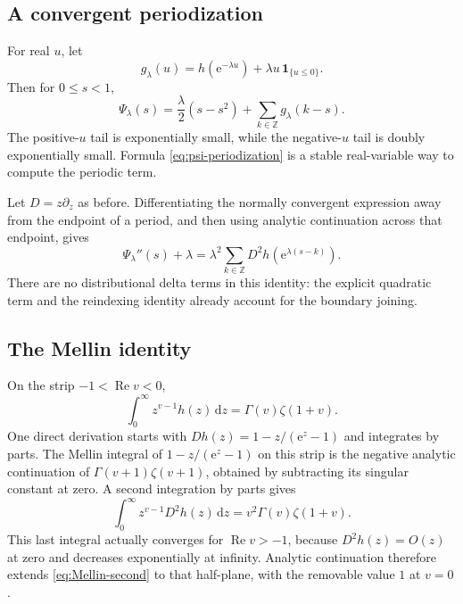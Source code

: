 \documentclass[11pt,a4paper]{article}
\numberwithin{equation}{section}
\theoremstyle{definition}
\newcommand{\Z}{\mathbb Z}
\newcommand{\dd}{\,\mathrm d}
\newcommand{\ee}{\mathrm e}
\begin{document}
\subsection{A convergent periodization}
For real $u$, let
\begin{equation}
 g_\lambda(u)=h(\ee^{-\lambda u})+\lambda u\,\mathbf1_{\{u\leq0\}}.
 \label{eq:g}
\end{equation}
Then for $0\leq s<1$,
\begin{equation}
 \Psi_\lambda(s)=\frac\lambda2(s-s^2)
       +\sum_{k\in\Z}g_\lambda(k-s).
 \label{eq:psi-periodization}
\end{equation}
The positive-$u$ tail is exponentially small, while the negative-$u$ tail is doubly exponentially small. Formula \eqref{eq:psi-periodization} is a stable real-variable way to compute the periodic term.

Let $D=z\partial_z$ as before. Differentiating the normally convergent expression away from the endpoint of a period, and then using analytic continuation across that endpoint, gives
\begin{equation}
 \Psi_\lambda''(s)+\lambda
 =\lambda^2\sum_{k\in\Z}D^2h(\ee^{\lambda(s-k)}).
 \label{eq:psi-second}
\end{equation}
There are no distributional delta terms in this identity: the explicit quadratic term and the reindexing identity already account for the boundary joining.

\subsection{The Mellin identity}
On the strip $-1<\operatorname{Re}v<0$,
\begin{equation}
 \int_0^\infty z^{v-1}h(z)\dd z=\Gamma(v)\zeta(1+v).
 \label{eq:Mellin-h}
\end{equation}
One direct derivation starts with
$Dh(z)=1-z/(\ee^z-1)$ and integrates by parts. The Mellin integral of $1-z/(\ee^z-1)$ on this strip is the negative analytic continuation of $\Gamma(v+1)\zeta(v+1)$, obtained by subtracting its singular constant at zero. A second integration by parts gives
\begin{equation}
 \int_0^\infty z^{v-1}D^2h(z)\dd z
 =v^2\Gamma(v)\zeta(1+v).
 \label{eq:Mellin-second}
\end{equation}
This last integral actually converges for $\operatorname{Re}v>-1$, because $D^2h(z)=O(z)$ at zero and decreases exponentially at infinity. Analytic continuation therefore extends \eqref{eq:Mellin-second} to that half-plane, with the removable value $1$ at $v=0$.
\end{document}

